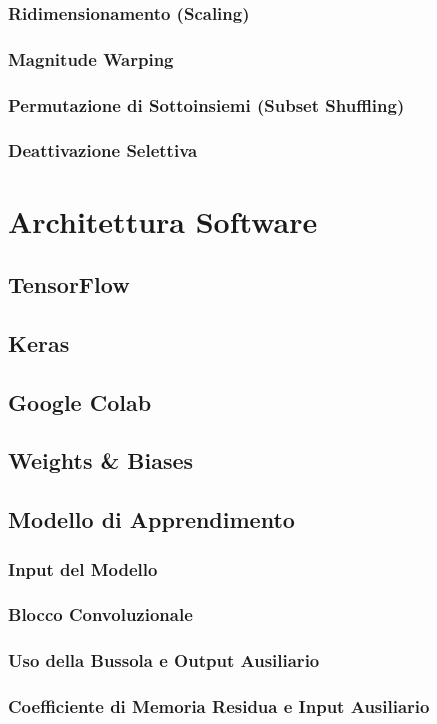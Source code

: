 \documentclass[12pt]{report}
\begin{document}
\subsection{Ridimensionamento (Scaling)}
\subsection{Magnitude Warping}
\subsection{Permutazione di Sottoinsiemi (Subset Shuffling)}
\subsection{Deattivazione Selettiva}


\chapter{Architettura Software}
\section{TensorFlow}
\section{Keras}
\section{Google Colab}
\section{Weights \& Biases}
\section{Modello di Apprendimento}
\subsection{Input del Modello}
\subsection{Blocco Convoluzionale}
\subsection{Uso della Bussola e Output Ausiliario}
\subsection{Coefficiente di Memoria Residua e Input Ausiliario}
\end{document}
